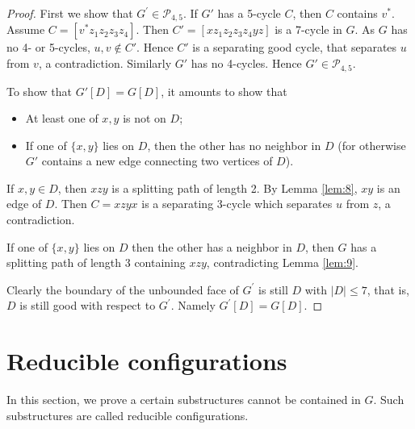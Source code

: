 \documentclass{article}
\begin{document}
\begin{proof}
    First we show that $G^{\prime} \in \mathcal{P}_{4,5}$. If $G'$ has a 5-cycle $C$, then $C$ contains $v^*$. Assume $C=  [v^*z_1z_2z_3z_4]$. Then $C'=[xz_1z_2z_3z_4yz]$ is a 7-cycle in $G$. As $G$ has no 4- or 5-cycles, $u,v \notin C'$. Hence $C'$ is a separating good cycle, that separates $u$ from $v$, a contradiction. Similarly $G'$ has no 4-cycles. Hence $G' \in \mathcal{P}_{4,5}$. 
    
    To show that $G'[D]=G[D]$, it amounts to show that 
   \begin{itemize}
    \item  At least one of $x,y$ is not on $D$;
    \item  If one of $\{x,y\}$ lies on $D$, then the other has no neighbor in $D$ (for otherwise $G'$ contains a new edge connecting two vertices of $D$). 
   \end{itemize}
     
    If $x,y\in D$, then $xzy$ is a splitting path of length 2.  By Lemma \ref{lem:8}, $xy$ is an edge of $D$. Then  $C=xzyx$ is a separating 3-cycle which separates $u$ from $z$, a contradiction.
    
    If one of $\{x,y\}$ lies on $D$ then the other has a neighbor in $D$, then $G$ has a splitting path of length 3 containing $xzy$, contradicting Lemma \ref{lem:9}.

    Clearly the boundary of the unbounded face of $G^{\prime}$ is still $D$ with $|D|\le 7$, that is, $D$ is still good with respect to $G^{\prime}$. Namely $G^{\prime}[D]=G[D]$.
\end{proof}
  
    

     

\section{ Reducible configurations}
\label{sec-property}

In this section, we prove a certain substructures cannot be contained in $G$. Such substructures are called reducible configurations.
\end{document}
